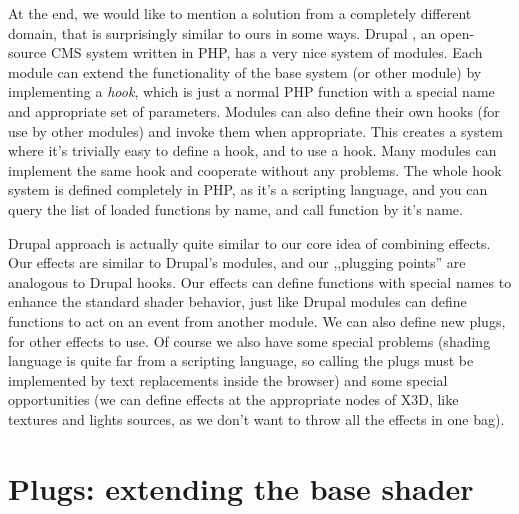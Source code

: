 \documentclass{acmsiggraph}                     %
\begin{document}
At the end, we would like to mention a solution from a completely
different domain, that is surprisingly similar to ours in some ways.
Drupal \cite{drupal}, an open-source CMS system written in PHP,
has a very nice system of modules. Each module
can extend the functionality of the base system (or other module)
by implementing a \textit{hook}, which is just a normal PHP function
with a special name and appropriate set of parameters. Modules can also define
their own hooks (for use by other modules) and invoke them when appropriate.
This creates a system where it's trivially easy to define a hook,
and to use a hook.
Many modules can implement the same hook and cooperate without any problems.
The whole hook system is defined completely in PHP, as it's a scripting
language, and you can query the list of loaded functions by name,
and call function by it's name.

Drupal approach is actually quite similar to our
core idea of combining effects. Our effects are similar to
Drupal's modules, and our ,,plugging points'' are analogous to Drupal hooks.
Our effects can define functions with special names to enhance
the standard shader behavior, just like Drupal modules can define functions
to act on an event from another module.
We can also define new plugs, for other effects to use.
Of course we also have some special problems
(shading language is quite far from a scripting language,
so calling the plugs must be implemented by text replacements inside the browser)
and some special opportunities (we can define effects at
the appropriate nodes of X3D, like textures and lights sources,
as we don't want to throw all the effects in one bag).

%
%

\section{Plugs: extending the base shader}
\end{document}
